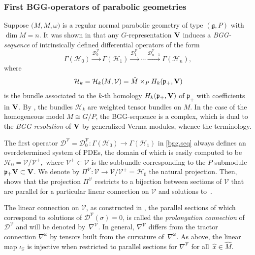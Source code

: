 \documentclass[pdftex]{sigma}
\numberwithin{equation}{section}
\theoremstyle{definition}
\newcommand{\cV}{{\mathcal V}}
\def\g{{\mathfrak g}}
\def\p{{\mathfrak p}}
\begin{document}
\subsubsection{First BGG-operators of parabolic geometries}\label{sec_BGG}
Suppose $\bigl(M,\hat{M},\omega\bigr)$ is a regular normal parabolic geometry of type $(\g,P)$ with $\dim M=n$. It was shown in \cite{CD.BGG, css.bgg.seqs} that any $G$-representation ${\bf V}$ induces a \emph{BGG-sequence}
of intrinsically defined differential operators of the form
\begin{equation}\label{bgg.seq}
 \Gamma(\mathcal H_0)\stackrel{\mathcal D^{\mathcal V}_0\ }{\rightarrow}\Gamma(\mathcal H_1)\overset{\mathcal D^{\mathcal V}_1\ }{\rightarrow}\cdots
 \overset{\mathcal D^{\mathcal V}_{n-1}}{\rightarrow}\Gamma(\mathcal H_{n}),
 \end{equation}
 where \[\mathcal H_k = \mathcal H_k(M,\mathcal V)=\hat{M}\times_P H_k(\p_+,{\bf V})\] is the bundle associated to the $k$-th homology $H_k(\p_+,{\bf V})$ of $\p_+$ with coefficients in ${\bf V}$. By \cite{kostant.harmonic.curv},
 the bundles $\mathcal H_k$ are weighted tensor bundles on $M$. In the case of the homogeneous model $M \cong G/P$, the BGG-sequence is a complex, which is dual to the \emph{BGG-resolution} of ${\bf V}$ by generalized Verma modules, whence the terminology.

 The first operator $\mathcal D^{\mathcal V} =\mathcal D^{\mathcal V}_0\colon \Gamma(\mathcal H_0)\rightarrow \Gamma(\mathcal H_1)$ in \eqref{bgg.seq} always defines an overdetermined system of PDEs, the
 domain of which is easily computed to be $\mathcal H_0=\mathcal V/\mathcal V^+,$ where $\mathcal V^+ \subset \mathcal V$ is the subbundle corresponding to the $P$-submodule $\p_+{\bf V} \subset {\bf V}$.
 We denote by $\Pi^\mathcal V\colon \mathcal V\rightarrow \mathcal V/\mathcal V^+=\mathcal H_0$ the natural projection. Then, \cite{hsss.prol.connxn, neuss.prolong} shows that the projection $\Pi^\mathcal V$ restricts to a bijection between
 sections of $\mathcal V$ that are parallel for a particular linear connection on $\cV$ and solutions to~.

 The linear connection on $\mathcal V$, as constructed in \cite{hsss.prol.connxn}, the parallel sections of which correspond to solutions of $\mathcal D^{\mathcal V}(\sigma)=0$, is called the \emph{prolongation connection} of $\mathcal D^{\mathcal V}$ and will be denoted by~$\nabla^\mathcal V$. In general, $\nabla^\mathcal V$ differs from the tractor connection $\nabla^\omega$ by tensors built from the curvature of~$\nabla^\omega$. As above, the linear map $\iota_{\hat{x}}$ is injective when restricted to parallel sections for $\nabla^{\mathcal{V}}$ for all~${\hat{x} \in \hat{M}}$.
\end{document}

